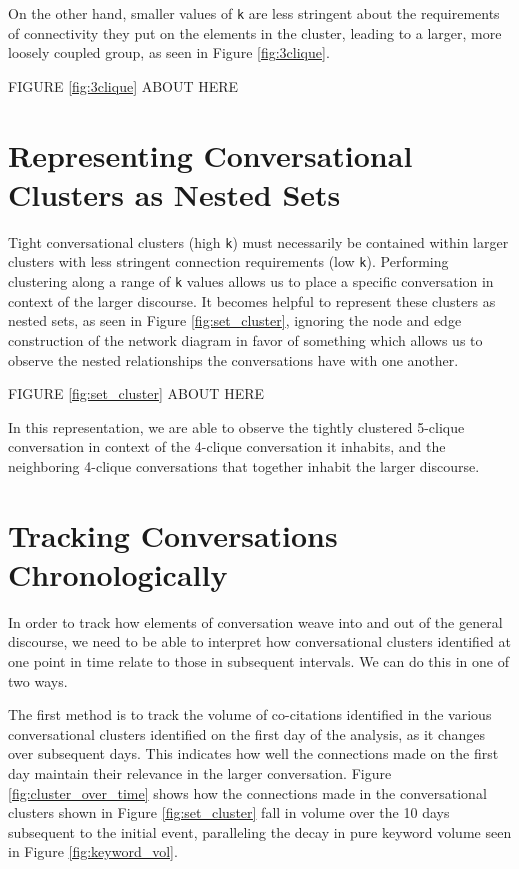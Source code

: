 \documentclass[12pt]{article}
\begin{document}
On the other hand, smaller values of \texttt{k} are less stringent about the requirements of connectivity they put on the elements in the cluster, leading to a larger, more loosely coupled group, as seen in Figure \ref{fig:3clique}.

\begin{center}
FIGURE \ref{fig:3clique} ABOUT HERE
\end{center}


\section{Representing Conversational Clusters as Nested Sets}

Tight conversational clusters (high \texttt{k}) must necessarily be contained within larger clusters with less stringent connection requirements (low \texttt{k}). Performing clustering along a range of \texttt{k} values allows us to place a specific conversation in context of the larger discourse. 
It becomes helpful to represent these clusters as nested sets, as seen in Figure \ref{fig:set_cluster}, ignoring the node and edge construction of the network diagram in favor of something which allows us to observe the nested relationships the conversations have with one another.

\begin{center}
FIGURE \ref{fig:set_cluster} ABOUT HERE
\end{center}

In this representation, we are able to observe the tightly clustered 5-clique conversation in context of the 4-clique conversation it inhabits, and the neighboring 4-clique conversations that together inhabit the larger discourse.

\section{Tracking Conversations Chronologically}
In order to track how elements of conversation weave into and out of the general discourse, we need to be able to interpret how conversational clusters identified at one point in time relate to those in subsequent intervals. We can do this in one of two ways. 

The first method is to track the volume of co-citations identified in the various conversational clusters identified on the first day of the analysis, as it changes over subsequent days. This indicates how well the connections made on the first day maintain their relevance in the larger conversation. Figure \ref{fig:cluster_over_time} shows how the connections made in the conversational clusters shown in Figure \ref{fig:set_cluster} fall in volume over the 10 days subsequent to the initial event, paralleling the decay in pure keyword volume seen in Figure \ref{fig:keyword_vol}.
\end{document}
